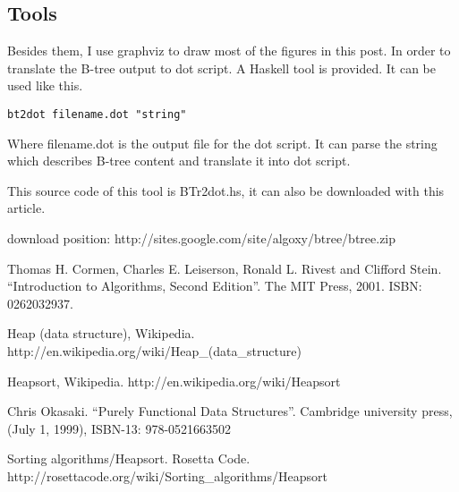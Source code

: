 \documentclass{article}
\begin{document}
\subsection{Tools}

Besides them, I use graphviz to draw most of the figures in this post. In order to
translate the B-tree output to dot script. A Haskell tool is provided.
It can be used like this.

\begin{verbatim}
bt2dot filename.dot "string"
\end{verbatim}

Where filename.dot is the output file for the dot script. It can
parse the string which describes B-tree content and translate it 
into dot script.

This source code of this tool is BTr2dot.hs, it can also be downloaded 
with this article.

download position: http://sites.google.com/site/algoxy/btree/btree.zip

\begin{thebibliography}{99}

Thomas H. Cormen, Charles E. Leiserson, Ronald L. Rivest and Clifford Stein. ``Introduction to Algorithms, Second Edition''. The MIT Press, 2001. ISBN: 0262032937.

Heap (data structure), Wikipedia. http://en.wikipedia.org/wiki/Heap\_(data\_structure)

Heapsort, Wikipedia. http://en.wikipedia.org/wiki/Heapsort

Chris Okasaki. ``Purely Functional Data Structures''. Cambridge university press, (July 1, 1999), ISBN-13: 978-0521663502

Sorting algorithms/Heapsort. Rosetta Code. http://rosettacode.org/wiki/Sorting\_algorithms/Heapsort

\end{thebibliography}

\ifx\wholebook\relax \else
\end{document}
